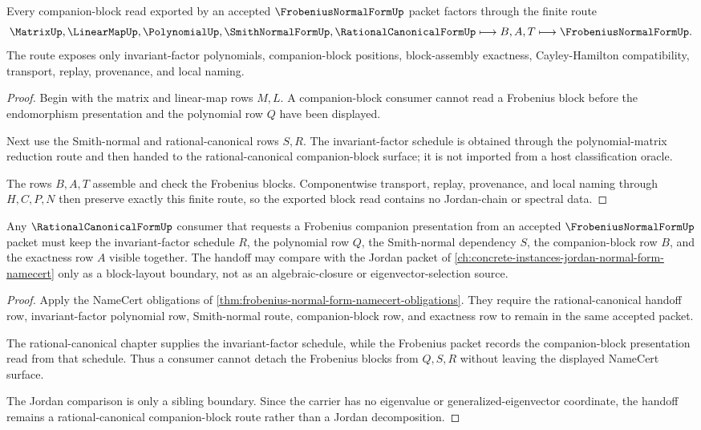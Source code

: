 \begin{theorem}
\label{thm:frobenius-normal-form-companion-block-route}
Every companion-block read exported by an accepted $\FrobeniusNormalFormUp$ packet factors through the finite route
$$
\MatrixUp,\LinearMapUp,\PolynomialUp,\SmithNormalFormUp,\RationalCanonicalFormUp \longmapsto B,A,T \longmapsto \FrobeniusNormalFormUp .
$$
The route exposes only invariant-factor polynomials, companion-block positions, block-assembly exactness, Cayley-Hamilton compatibility, transport, replay, provenance, and local naming.
\end{theorem}
\begin{proof}
Begin with the matrix and linear-map rows $M,L$. A companion-block consumer cannot read a Frobenius block before the endomorphism presentation and the polynomial row $Q$ have been displayed.

Next use the Smith-normal and rational-canonical rows $S,R$. The invariant-factor schedule is obtained through the polynomial-matrix reduction route and then handed to the rational-canonical companion-block surface; it is not imported from a host classification oracle.

The rows $B,A,T$ assemble and check the Frobenius blocks. Componentwise transport, replay, provenance, and local naming through $H,C,P,N$ then preserve exactly this finite route, so the exported block read contains no Jordan-chain or spectral data.
\end{proof}

\begin{theorem}
\label{thm:frobenius-normal-form-rational-canonical-handoff}
Any $\RationalCanonicalFormUp$ consumer that requests a Frobenius companion presentation from an accepted $\FrobeniusNormalFormUp$ packet must keep the invariant-factor schedule $R$, the polynomial row $Q$, the Smith-normal dependency $S$, the companion-block row $B$, and the exactness row $A$ visible together. The handoff may compare with the Jordan packet of \autoref{ch:concrete-instances-jordan-normal-form-namecert} only as a block-layout boundary, not as an algebraic-closure or eigenvector-selection source.
\end{theorem}
\begin{proof}
Apply the NameCert obligations of \autoref{thm:frobenius-normal-form-namecert-obligations}. They require the rational-canonical handoff row, invariant-factor polynomial row, Smith-normal route, companion-block row, and exactness row to remain in the same accepted packet.

The rational-canonical chapter supplies the invariant-factor schedule, while the Frobenius packet records the companion-block presentation read from that schedule. Thus a consumer cannot detach the Frobenius blocks from $Q,S,R$ without leaving the displayed NameCert surface.

The Jordan comparison is only a sibling boundary. Since the carrier has no eigenvalue or generalized-eigenvector coordinate, the handoff remains a rational-canonical companion-block route rather than a Jordan decomposition.
\end{proof}

